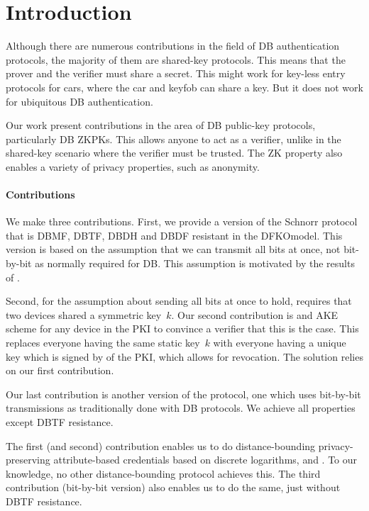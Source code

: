 \section{Introduction}%
\label{Introduction}

Although there are numerous contributions in the field of \ac{DB} 
authentication protocols, the majority of them are shared-key protocols.
This means that the prover and the verifier must share a secret.
This might work for key-less entry protocols for cars, where the car and keyfob 
can share a key.
But it does not work for ubiquitous \ac{DB} authentication.

Our work present contributions in the area of \ac{DB} public-key protocols, 
particularly \ac{DB} \acp{ZKPK}.
This allows anyone to act as a verifier, unlike in the shared-key scenario 
where the verifier must be trusted.
The \ac{ZK} property also enables a variety of privacy properties, such as 
anonymity.

\paragraph*{Contributions}

We make three contributions.
First, we provide a version of the Schnorr protocol that is \ac{DBMF}, 
\ac{DBTF}, \ac{DBDH} and \ac{DBDF} resistant in the \ac{DFKOmodel}.
This version is based on the assumption that we can transmit all bits at once, 
not bit-by-bit as normally required for \ac{DB}.
This assumption is motivated by the results of \textcite{UWBPR}.

Second, for the assumption about sending all bits at once to hold, 
\textcite{UWBPR} requires that two devices shared a symmetric key~\(k\).
Our second contribution is  and \ac{AKE} scheme for any device in 
the \ac{PKI} to convince a verifier that this is the case.
This replaces everyone having the same static key~\(k\) with everyone having a 
unique key which is signed by  of the \ac{PKI}, which allows for 
revocation.
The solution relies on our first contribution.

Our last contribution is another version of the protocol, one which uses 
bit-by-bit transmissions as traditionally done with \ac{DB} protocols.
We achieve all properties except \ac{DBTF} resistance.

The first (and second) contribution enables us to do distance-bounding 
privacy-preserving attribute-based credentials based on discrete logarithms, 
\eg \cite{Camenisch-phdthesis} and \cite{CLsignatures}.
To our knowledge, no other distance-bounding protocol achieves this.
The third contribution (bit-by-bit version) also enables us to do the same, 
just without \ac{DBTF} resistance.

